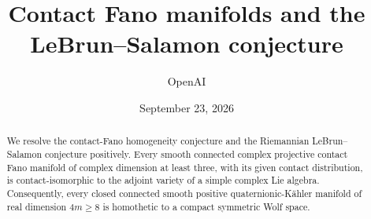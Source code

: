 \documentclass[11pt]{article}
\title{Contact Fano manifolds and the\\ LeBrun--Salamon conjecture}
\author{OpenAI}
\date{September 23, 2026}
\theoremstyle{definition}
\theoremstyle{remark}
\numberwithin{equation}{section}
\begin{document}
\maketitle
\begin{abstract}
We resolve the contact-Fano homogeneity conjecture and the Riemannian
LeBrun--Salamon conjecture positively. Every smooth connected complex
projective contact Fano manifold of complex dimension at least three,
with its given contact distribution, is contact-isomorphic to the
adjoint variety of a simple complex Lie algebra. Consequently, every
closed connected smooth positive quaternionic-K\"ahler manifold of real
dimension $4m\geq8$ is homothetic to a compact symmetric Wolf space.
\end{abstract}










\end{document}
